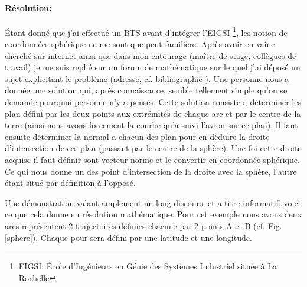             \paragraph{Résolution:}
Étant donné que j'ai effectué un BTS avant d'intégrer l'EIGSI \footnote{EIGSI: École d'Ingénieurs en Génie des Systèmes Industriel située à La Rochelle}, les notion de coordonnées sphérique ne me sont que peut familière. Après avoir en vainc cherché sur internet ainsi que dans mon entourage  (maître de stage, collègues de travail) je me suis replié sur un forum de mathématique sur le quel j'ai déposé un sujet explicitant le problème (adresse, cf. bibliographie \cite{forummath}). Une personne nous a donnée une solution qui, après connaissance, semble tellement simple qu'on se demande pourquoi personne n'y a pensés. Cette solution consiste a déterminer les plan défini par les deux points aux extrémités de chaque arc et par le centre de la terre (ainsi nous avons forcement la courbe qu'a suivi l'avion sur ce plan). Il faut ensuite déterminer la normal a chacun des plan pour en déduire la droite d'intersection de ces plan (passant par le centre de la sphère). Une foi cette droite acquise il faut définir sont vecteur norme et le convertir en coordonnée sphérique. Ce qui nous donne un des point d'intersection de la droite avec la sphère, l'autre étant situé par définition à l'opposé.

Une démonstration valant amplement un long discours, et a titre informatif, voici ce que cela donne en résolution mathématique. Pour cet exemple nous avons deux arcs représentent 2 trajectoires définies chacune par 2 points A et B (cf. Fig. \vref{sphere}). Chaque pour sera défini par une latitude et une longitude.

